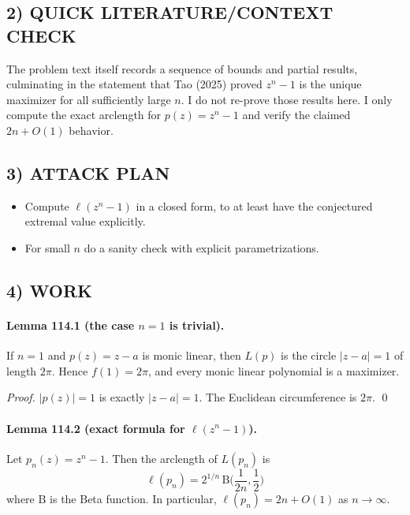 \subsection*{2) QUICK LITERATURE/CONTEXT CHECK}
The problem text itself records a sequence of bounds and partial results, culminating in the statement that Tao (2025) proved $z^n-1$ is the unique maximizer for all sufficiently large $n$.  I do not re-prove those results here.  I only compute the exact arclength for $p(z)=z^n-1$ and verify the claimed $2n+O(1)$ behavior.

\subsection*{3) ATTACK PLAN}
\begin{itemize}
\item Compute $\ell(z^n-1)$ in a closed form, to at least have the conjectured extremal value explicitly.
\item For small $n$ do a sanity check with explicit parametrizations.
\end{itemize}

\subsection*{4) WORK}
\paragraph{Lemma 114.1 (the case $n=1$ is trivial).}
If $n=1$ and $p(z)=z-a$ is monic linear, then $L(p)$ is the circle $|z-a|=1$ of length $2\pi$.  Hence $f(1)=2\pi$, and every monic linear polynomial is a maximizer.

\emph{Proof.}
$|p(z)|=1$ is exactly $|z-a|=1$.  The Euclidean circumference is $2\pi$. \qed

\paragraph{Lemma 114.2 (exact formula for $\ell(z^n-1)$).}
Let $p_n(z)=z^n-1$.  Then the arclength of $L(p_n)$ is
\[
\ell(p_n)=2^{1/n}\,\mathrm B\Big(\frac{1}{2n},\frac12\Big)
\]
where $\mathrm B$ is the Beta function.  In particular, $\ell(p_n)=2n+O(1)$ as $n\to\infty$.

